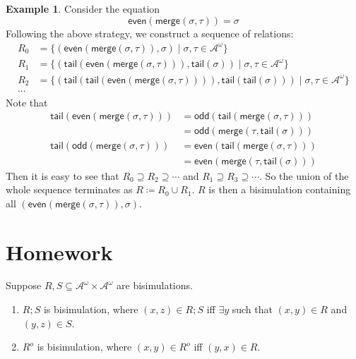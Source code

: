 \documentclass{article}
\newcommand{\alphA}{\mathcal{A}}
\newcommand{\odd}{\mathsf{odd}}
\newcommand{\even}{\mathsf{even}}
\newcommand{\merge}{\mathsf{merge}}
\newcommand{\tail}{\mathsf{tail}}
\theoremstyle{definition}
\theoremstyle{definition}
\newtheorem{example}[theorem]{Example}
\begin{document}
\begin{example}
Consider the equation
\begin{equation}
    \even(\merge (\sigma, \tau)) = \sigma
\end{equation}
Following the above strategy, we construct a sequence of relations:
\begin{align*}
    R_0 & = \{ (\even (\merge(\sigma,\tau)), \sigma) \mid \sigma, \tau \in \alphA^\omega \} \\
    R_1 & = \{ ( \tail(\even(\merge(\sigma,\tau))), \tail(\sigma) ) \mid \sigma, \tau \in \alphA^\omega \} \\
    R_2 & = \{ ( \tail(\tail(\even(\merge(\sigma,\tau)))), \tail(\tail(\sigma)) ) \mid \sigma, \tau \in \alphA^\omega \} \\
    \cdots
\end{align*}
Note that
\begin{align*}
    \tail(\even(\merge(\sigma,\tau))) & = \odd( \tail(\merge(\sigma,\tau)) ) \\
    & = \odd( \merge(\tau, \tail(\sigma)) ) \\
    \tail(\odd(\merge(\sigma,\tau))) & = \even( \tail(\merge(\sigma,\tau)) ) \\
    & = \even(\merge(\tau, \tail(\sigma)))
\end{align*}
Then it is easy to see that $R_0 \supseteq R_2 \supseteq \cdots$ and $R_1 \supseteq R_3 \supseteq \cdots$. So the union of the whole sequence terminates as $R \coloneqq R_0\cup R_1$. $R$ is then a bisimulation containing all $(\even(\merge(\sigma, \tau)), \sigma)$.
\end{example}

\section*{Homework}
Suppose $R, S\subseteq \alphA^\omega \times \alphA^\omega$ are bisimulations.
\begin{enumerate}
    \item $R; S$ is bisimulation, where $(x,z) \in R;S$ iff $\exists y$ such that $(x,y)\in R$ and $(y,z) \in S$.
    \item $R^{o}$ is bisimulation, where $(x,y) \in R^{o}$ iff $(y,x)\in R$.
\end{enumerate}
\end{document}
